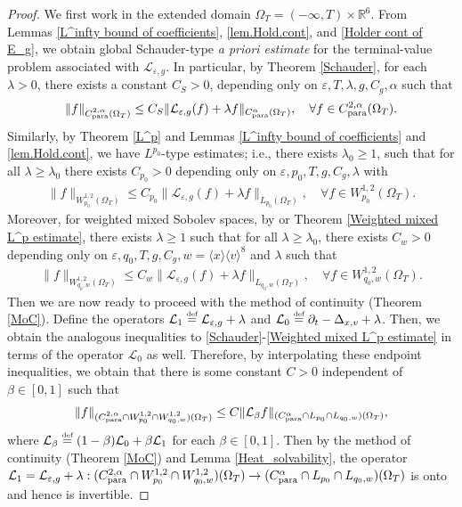 \documentclass[reqno,11pt,final]{amsart}
\theoremstyle{plain}
\numberwithin{equation}{section}
\numberwithin{theorem}{section}
\newcommand{\eqdef }{\overset{\mbox{\tiny{def}}}{=}}
\begin{document}
\begin{proof}
We first work in the extended domain $\Omega_T = (-\infty, T)\times\mathbb{R}^6$. From Lemmas \ref{L^infty bound of coefficients}, \ref{lem.Hold.cont}, and \ref{Holder cont of E_g}, we obtain global Schauder-type \textit{a priori estimate} for the terminal-value problem associated with $\mathcal{L}_{\varepsilon,g}$. In particular, by Theorem \ref{Schauder}, for each $\lambda>0$, there exists a constant $C_S>0$, depending only on $\varepsilon, T, \lambda, g, C_g, \alpha$ such that
\begin{align}\label{lem4.4eq1}
\lVert f\rVert_{C_\textup{para}^{2,\alpha}(\Omega_T)} \le C_S \lVert \mathcal{L}_{\varepsilon,g}(f) + \lambda f\rVert_{C_\textup{para}^{\alpha}(\Omega_T)}, \quad \forall f\in C_\textup{para}^{2,\alpha}(\Omega_T).
\end{align}Similarly, by Theorem \ref{L^p} and Lemmas \ref{L^infty bound of coefficients} and \ref{lem.Hold.cont}, we have $L^{p_0}$-type estimates; i.e., there exists $\lambda_0\ge1$, such that for all $\lambda\ge \lambda_0$ there exists $C_{p_0}>0$ depending only on $\varepsilon, p_0, T, g, C_g,\lambda$ with
\begin{align}\label{lem4.4eq2}
\lVert f\rVert_{W_{p_0}^{1,2}(\Omega_T)} \le C_{p_0}\lVert \mathcal{L}_{\varepsilon,g}(f) + \lambda f\rVert_{L_{p_0}(\Omega_T)}, \quad \forall f\in W_{p_0}^{1,2}(\Omega_T).
\end{align}Moreover, for weighted mixed Sobolev spaces, by \cite{Ell_Dong_2018} or Theorem \ref{Weighted mixed L^p estimate}, there exists $\lambda\ge1$ such that for all $\lambda\ge \lambda_0$, there exists $C_w>0$ depending only on $\varepsilon, q_0, T, g, C_g, w=\langle x\rangle \langle v\rangle^8$ and $\lambda$ such that
\begin{align}\label{lem4.4eq3}
\lVert f\rVert_{W_{q_0,w}^{1,2}(\Omega_T)} \le C_w\lVert \mathcal{L}_{\varepsilon,g} (f) + \lambda f\rVert_{L_{q_0,w}(\Omega_T)}, \quad \forall f\in W_{q_0,w}^{1,2}(\Omega_T).
\end{align}
Then we are now ready to proceed with the method of continuity (Theorem \ref{MoC}). Define the operators $\mathcal{L}_1 \eqdef \mathcal{L}_{\varepsilon, g}+\lambda$ and $\mathcal{L}_0\eqdef \partial_t - \Delta_{x,v}+\lambda$. Then, we obtain the analogous inequalities to \ref{Schauder}-\ref{Weighted mixed L^p estimate} in terms of the operator $\mathcal{L}_0$ as well. Therefore, by interpolating these endpoint inequalities, we obtain that 
there is some constant $C>0$ independent of $\beta\in[0,1]$ such that 
$$\|f\|_{(C_\textup{para}^{2,\alpha}\cap W_{p_0}^{1,2}\cap W_{q_0,w}^{1,2})(\Omega_T)}\le C\|\mathcal{L}_\beta f\|_{(C^\alpha_\textup{para} \cap L_{p_0} \cap L_{q_0,w})(\Omega_T)},$$ where $\mathcal{L}_\beta\eqdef(1-\beta)\mathcal{L}_0+\beta\mathcal{L}_1$ for each $\beta\in[0,1].$
Then by the method of continuity (Theorem \ref{MoC}) and Lemma \ref{Heat_solvability}, the operator $\mathcal{L}_1=\mathcal{L}_{\varepsilon,g} + \lambda:(C_\textup{para}^{2,\alpha}\cap W_{p_0}^{1,2}\cap W_{q_0,w}^{1,2})(\Omega_T)\to (C^\alpha_\textup{para} \cap L_{p_0} \cap L_{q_0,w})(\Omega_T)$ is onto and hence is invertible. 


\end{proof}
\end{document}
